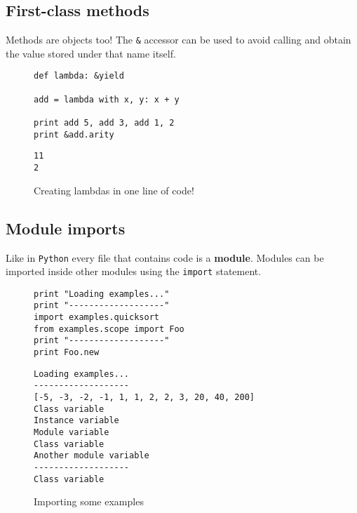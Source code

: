 \documentclass[a4paper,11pt]{article}
\begin{document}
\subsection{First-class methods}
Methods are objects too! The \texttt{\&} accessor can be used to avoid calling and obtain the
  value stored under that name itself.
\begin{figure}[h!]
\begin{lstlisting}[language=hal]
def lambda: &yield

add = lambda with x, y: x + y

print add 5, add 3, add 1, 2
print &add.arity
\end{lstlisting}
\begin{lstlisting}[language=output]
11
2
\end{lstlisting}
\caption{Creating lambdas in one line of code!}
\label{first_class_methods}
\end{figure}
\subsection{Module imports}
Like in \texttt{Python} every file that contains code is a \textbf{module}. Modules can be imported inside
  other modules using the \texttt{import} statement.
\begin{figure}[h!]
\begin{lstlisting}[language=hal]
print "Loading examples..."
print "-------------------"
import examples.quicksort
from examples.scope import Foo
print "-------------------"
print Foo.new
\end{lstlisting}
\begin{lstlisting}[language=output]
Loading examples...
-------------------
[-5, -3, -2, -1, 1, 1, 2, 2, 3, 20, 40, 200]
Class variable
Instance variable
Module variable
Class variable
Another module variable
-------------------
Class variable
\end{lstlisting}
\caption{Importing some examples}
\label{import}
\end{figure}
\clearpage
\end{document}
